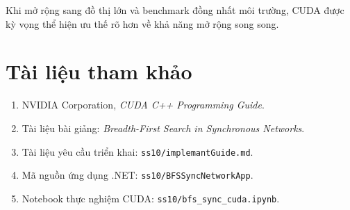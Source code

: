 \documentclass[12pt,a4paper]{article}
\begin{document}
Khi mở rộng sang đồ thị lớn và benchmark đồng nhất môi trường,
CUDA được kỳ vọng thể hiện ưu thế rõ hơn về khả năng mở rộng song song.

\section{Tài liệu tham khảo}
\begin{enumerate}
    \item NVIDIA Corporation, \textit{CUDA C++ Programming Guide}.
    \item Tài liệu bài giảng: \textit{Breadth-First Search in Synchronous Networks}.
    \item Tài liệu yêu cầu triển khai: \texttt{ss10/implemantGuide.md}.
    \item Mã nguồn ứng dụng .NET: \texttt{ss10/BFSSyncNetworkApp}.
    \item Notebook thực nghiệm CUDA: \texttt{ss10/bfs\_sync\_cuda.ipynb}.
\end{enumerate}
\end{document}
